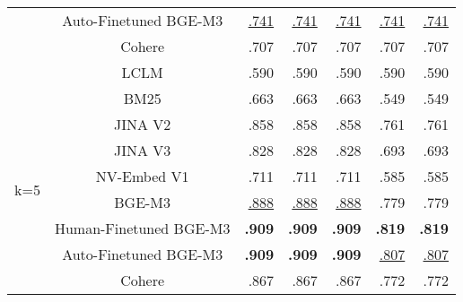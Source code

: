 \begin{table}[ht]
\begin{tabular}{@{}ccrrrrr@{}}
                      & Auto-Finetuned BGE-M3  & \underline{ .741}              & \underline{ .741}                    & \underline{ .741}                  & \underline{ .741}               & \underline{ .741}                     \\
                      & Cohere                 & .707                    & .707                          & .707                        & .707                     & .707                           \\
                      & LCLM                   & .590                    & .590                          & .590                        & .590                     & .590                           \\ \midrule
\multirow{9}{*}{k=5}  & BM25                   & .663                    & .663                          & .663                        & .549                     & .549                           \\
                      & JINA V2                & .858                    & .858                          & .858                        & .761                     & .761                           \\
                      & JINA V3                & .828                    & .828                          & .828                        & .693                     & .693                           \\
                      & NV-Embed V1            & .711                    & .711                          & .711                        & .585                     & .585                           \\
                      & BGE-M3                 & \underline{ .888}              & \underline{ .888}                    & \underline{ .888}                  & .779                     & .779                           \\
                      & Human-Finetuned BGE-M3 & \textbf{.909}           & \textbf{.909}                 & \textbf{.909}               & \textbf{.819}            & \textbf{.819}                  \\
                      & Auto-Finetuned BGE-M3  & \textbf{.909}           & \textbf{.909}                 & \textbf{.909}               & \underline{ .807}               & \underline{ .807}                     \\
                      & Cohere                 & .867                    & .867                          & .867                        & .772                     & .772                           \\

\end{tabular}
\end{table}
